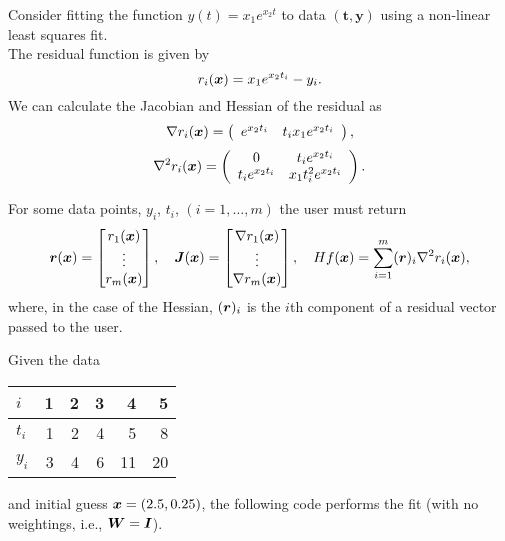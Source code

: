 
Consider fitting the function $y(t) = x_1e^{x_2 t}$ to data $(\bm{t}, \bm{y})$
using a non-linear least squares fit.\\
The residual function is given by
$$
   r_i({\bm x})  = x_1 e^{x_2 t_i} - y_i.
$$
We can calculate the Jacobian and Hessian of the residual as
$$
   \nabla r_i({\bm x}) = \left(\begin{array}{cc}
      e^{x_2 t_i} &
      t_i x_1 e^{x_2 t_i}
      \end{array}\right),
$$
$$
   \nabla^2 r_i({\bm x}) = \left(\begin{array}{cc}
      0                 & t_i e^{x_2 t_i}    \\
      t_i e^{x_2 t_i}     & x_1 t_i^2 e^{x_2 t_i}
   \end{array}\right).
$$

For some data points, $y_i$, $t_i$, $(i = 1,\dots,m)$ the user must return
$$  {\bm r}({\bm x}) = \begin{bmatrix}
      r_1({\bm x})\\
      \vdots \\
      r_m({\bm x})
    \end{bmatrix}, \quad   {\bm J}({\bm x}) =
    \begin{bmatrix}
      \nabla r_1({\bm x}) \\
      \vdots \\
      \nabla r_m({\bm x}) \\
    \end{bmatrix}, \quad
    Hf({\bm x}) =
    \sum_{i=1}^m
    ({\bm r})_i \nabla^2 r_i({\bm x}),
$$
where, in the case of the Hessian, $({\bm r})_i$ is the $i$th component of a residual vector passed to the user.

Given the data
\begin{center}
   \begin{tabular}{l|*{5}{r}}
      $i$   & 1 & 2 & 3  & 4  & 5 \\
      \hline
      $t_i$ & 1 & 2 & 4  & 5  & 8 \\
      $y_i$ & 3 & 4 & 6 & 11 & 20
   \end{tabular}
\end{center}
and initial guess ${\bm x} = (2.5, 0.25)$, the following code performs the fit (with no
weightings, i.e., ${\bm W} = {\bm I}$).

